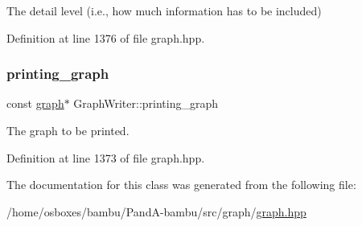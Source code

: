 The detail level (i.\+e., how much information has to be included) 



Definition at line 1376 of file graph.\+hpp.

\mbox{\label{classGraphWriter_ac96afdb56e6ac1fec12089e973fa25fa}} 
\subsubsection{\texorpdfstring{printing\+\_\+graph}{printing\_graph}}
{\footnotesize\ttfamily const \hyperlink{structgraph}{graph}$\ast$ Graph\+Writer\+::printing\+\_\+graph\hspace{0.3cm}{\ttfamily [protected]}}



The graph to be printed. 



Definition at line 1373 of file graph.\+hpp.



The documentation for this class was generated from the following file\+:\begin{DoxyCompactItemize}
\item 
/home/osboxes/bambu/\+Pand\+A-\/bambu/src/graph/\hyperlink{graph_8hpp}{graph.\+hpp}\end{DoxyCompactItemize}
